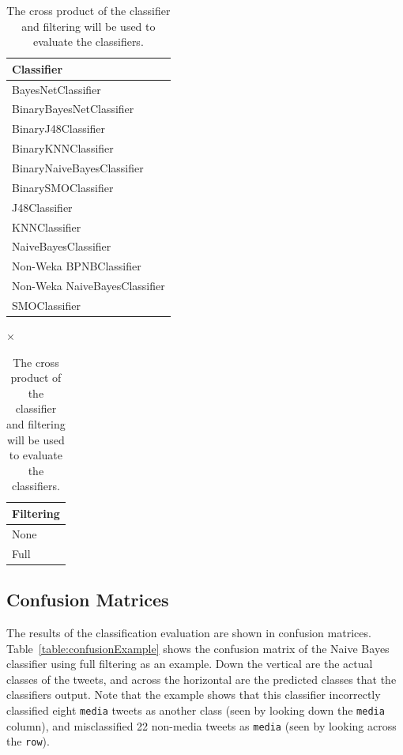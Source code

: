 \documentclass[12pt]{ucthesis}
\begin{document}
\begin{table}[H]
   \begin{center}
      \begin{tabular}{|l|}
         \hline
            \textbf{Classifier}
         \tabularnewline\hline
            BayesNetClassifier
         \tabularnewline\hline
            BinaryBayesNetClassifier
         \tabularnewline\hline
            BinaryJ48Classifier
         \tabularnewline\hline
            BinaryKNNClassifier
         \tabularnewline\hline
            BinaryNaiveBayesClassifier
         \tabularnewline\hline
            BinarySMOClassifier
         \tabularnewline\hline
            J48Classifier
         \tabularnewline\hline
            KNNClassifier
         \tabularnewline\hline
            NaiveBayesClassifier
         \tabularnewline\hline
            Non-Weka BPNBClassifier
         \tabularnewline\hline
            Non-Weka NaiveBayesClassifier
         \tabularnewline\hline
            SMOClassifier
         \tabularnewline\hline
      \end{tabular}
      {
         \Huge
         $\times$
      }
      \begin{tabular}{|l|}
         \hline
            \textbf{Filtering}
         \tabularnewline\hline
            None
         \tabularnewline\hline
            Full
         \tabularnewline\hline
      \end{tabular}
      \caption[Classifier Evaluation Combinations]{The cross product of the classifier and filtering will be used to evaluate the classifiers.}
      \label{table:classifierEvaluationSpace}
   \end{center}
\end{table}

\subsection{Confusion Matrices}
\label{class-evaluation-confusion}
The results of the classification evaluation are shown in confusion matrices.
Table~\ref{table:confusionExample} shows the confusion matrix of the Naive Bayes classifier using full filtering as an example.
Down the vertical are the actual classes of the tweets, and across the horizontal are the predicted classes that the classifiers output.
Note that the example shows that this classifier incorrectly classified eight \texttt{media} tweets as another class (seen by looking down the \texttt{media} column),
and misclassified 22 non-media tweets as \texttt{media} (seen by looking across the \texttt{row}).
\end{document}
